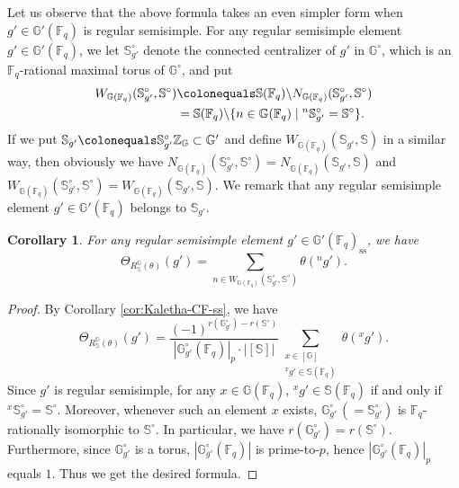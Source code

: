 \documentclass{amsart}
\renewcommand{\ss}{\mathrm{ss}}
\newcommand{\F}{\mathbb{F}}
\newcommand{\FF}{\mathbb{F}}
\newcommand{\bbS}{\mathbb{S}}
\newcommand{\bbG}{\mathbb{G}}
\newcommand{\bbZ}{\mathbb{Z}}
\theoremstyle{plain}
\newtheorem{cor}[thm]{Corollary}
\theoremstyle{definition}
\theoremstyle{remark}
\theoremstyle{theorem}
\begin{document}
Let us observe that the above formula takes an even simpler form when $g'\in\bbG'(\F_{q})$ is regular semisimple.
For any regular semisimple element $g'\in\bbG'(\F_{q})$, we let $\bbS_{g'}^{\circ}$ denote the connected centralizer of $g'$ in $\bbG^{\circ}$, which is an $\F_{q}$-rational maximal torus of $\bbG^{\circ}$, and put
\begin{align*}
W_{\bbG(\F_{q})}(\bbS^{\circ}_{g'},\bbS^{\circ})
&\colonequals \bbS(\F_{q})\backslash N_{\bbG(\F_{q})}(\bbS^{\circ}_{g'},\bbS^{\circ})\\
&=\bbS(\F_{q})\backslash\{n\in\bbG(\F_{q}) \mid {}^{n}\bbS^{\circ}_{g'}=\bbS^{\circ} \}.
\end{align*}
If we put $\bbS_{g'}\colonequals \bbS_{g'}^{\circ}\bbZ_{\bbG}\subset\bbG'$ and define $W_{\bbG(\F_{q})}(\bbS_{g'},\bbS)$ in a similar way, then obviously we have $N_{\bbG(\F_{q})}(\bbS_{g'}^{\circ},\bbS^{\circ})=N_{\bbG(\F_{q})}(\bbS_{g'},\bbS)$ and $W_{\bbG(\F_{q})}(\bbS_{g'}^{\circ},\bbS^{\circ})=W_{\bbG(\F_{q})}(\bbS_{g'},\bbS)$.
We remark that any regular semisimple element $g'\in\bbG'(\F_{q})$ belongs to $\bbS_{g'}$.

\begin{cor}\label{cor:Kaletha-CF-reg}
For any regular semisimple element $g'\in\bbG'(\F_{q})_{\ss}$, we have
\[
\Theta_{R_{\bbS}^{\bbG}(\theta)}(g')
=
\sum_{n\in W_{\bbG(\F_{q})}(\bbS^{\circ}_{g'},\bbS^{\circ})}\theta({}^{n}g').
\]
\end{cor}

\begin{proof}
By Corollary \ref{cor:Kaletha-CF-ss}, we have
\[
\Theta_{R_{\bbS}^{\bbG}(\theta)}(g') = \frac{(-1)^{r(\bbG_{g'}^\circ) - r(\bbS^{\circ})}}{|\bbG_{g'}^\circ(\FF_q)|_p \cdot |[\bbS]|} \sum_{\substack{x \in [\bbG] \\ {}^x g' \in \bbS(\FF_q)}} \theta({}^x g').
\]
Since $g'$ is regular semisimple, for any $x\in\bbG(\F_{q})$, ${}^{x}g'\in\bbS(\F_{q})$ if and only if ${}^{x}\bbS^{\circ}_{g'}=\bbS^{\circ}$.
Moreover, whenever such an element $x$ exists, $\bbG^{\circ}_{g'} \,(=\bbS_{g'}^{\circ})$ is $\F_{q}$-rationally isomorphic to $\bbS^{\circ}$.
In particular, we have $r(\bbG_{g'}^{\circ})=r(\bbS^{\circ})$.
Furthermore, since $\bbG^{\circ}_{g'}$ is a torus, $|\bbG^{\circ}_{g'}(\F_{q})|$ is prime-to-$p$, hence $|\bbG^{\circ}_{g'}(\F_{q})|_{p}$ equals $1$.
Thus we get the desired formula.
\end{proof}
\end{document}
